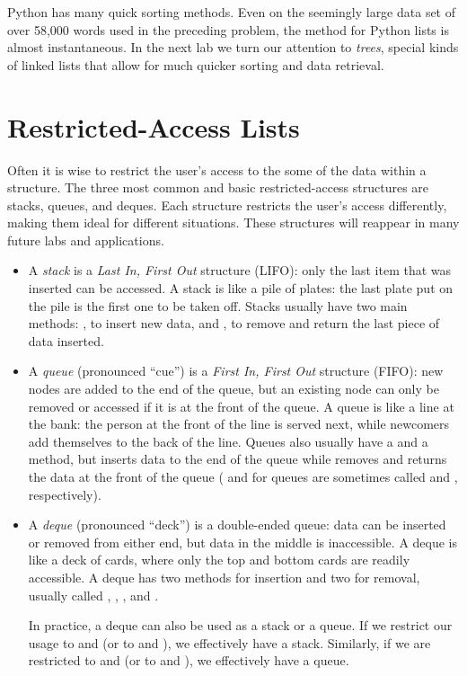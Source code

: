 \begin{info}
Python has many quick sorting methods.
Even on the seemingly large data set of over 58,000 words used in the preceding problem, the  method for Python lists is almost instantaneous.
In the next lab we turn our attention to \emph{trees}, special kinds of linked lists that allow for much quicker sorting and data retrieval.
\end{info}

\section*{Restricted-Access Lists}
Often it is wise to restrict the user's access to the some of the data within a structure.
The three most common and basic restricted-access structures are stacks, queues, and deques.
Each structure restricts the user's access differently, making them ideal for different situations.
These structures will reappear in many future labs and applications.

\begin{itemize}
\item A \emph{stack} is a \emph{Last In, First Out} structure (LIFO): only the last item that was inserted can be accessed.
A stack is like a pile of plates: the last plate put on the pile is the first one to be taken off.
Stacks usually have two main methods: , to insert new data, and , to remove and return the last piece of data inserted.

\item A \emph{queue} (pronounced ``cue'') is a \emph{First In, First Out} structure (FIFO): new nodes are added to the end of the queue, but an existing node can only be removed or accessed if it is at the front of the queue.
A queue is like a line at the bank: the person at the front of the line is served next, while newcomers add themselves to the back of the line.
Queues also usually have a  and a  method, but  inserts data to the end of the queue while  removes and returns the data at the front of the queue ( and  for queues are sometimes called  and , respectively).

\item A \emph{deque} (pronounced ``deck'') is a double-ended queue: data can be inserted or removed from either end, but data in the middle is inaccessible.
A deque is like a deck of cards, where only the top and bottom cards are readily accessible.
A deque has two methods for insertion and two for removal, usually called , , , and .

In practice, a deque can also be used as a stack or a queue.
If we restrict our usage to  and  (or to  and ), we effectively have a stack.
Similarly, if we are restricted to  and  (or to  and ), we effectively have a queue.
\end{itemize}

